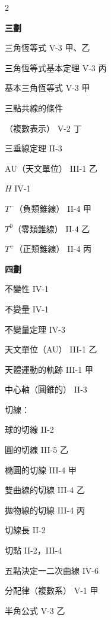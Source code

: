 \begin{multicols}{2}
\vspace{0.8em}
\begin{center}
\textbf{\large 三\quad 劃}
\end{center}

\noindent 三角恆等式 \hfill V-3 甲、乙\par
\noindent 三角恆等式基本定理 \hfill V-3 丙\par
\noindent 基本三角恆等式 \hfill V-3 甲\par
\noindent 三點共線的條件\par
\noindent\hspace*{1.5em} （複數表示） \hfill V-2 丁\par
\noindent 三垂線定理 \hfill II-3\par
\noindent $\text{AU}$（天文單位） \hfill III-1 乙\par
\noindent $H$ \hfill IV-1\par
\noindent $T^-$（負類錐線） \hfill II-4 甲\par
\noindent $T^0$（零類錐線） \hfill II-4 乙\par
\noindent $T^+$（正類錐線） \hfill II-4 丙\par

\vspace{0.8em}
\begin{center}
\textbf{\large 四\quad 劃}
\end{center}

\noindent 不變性 \hfill IV-1\par
\noindent 不變量 \hfill IV-1\par
\noindent 不變量定理 \hfill IV-3\par
\noindent 天文單位（AU） \hfill III-1 乙\par
\noindent 天體運動的軌跡 \hfill III-1 甲\par
\noindent 中心軸（圓錐的） \hfill II-3\par
\noindent 切線：\par
\noindent\hspace*{1.5em} 球的切線 \hfill II-2\par
\noindent\hspace*{1.5em} 圓的切線 \hfill III-5 乙\par
\noindent\hspace*{1.5em} 橢圓的切線 \hfill III-4 甲\par
\noindent\hspace*{1.5em} 雙曲線的切線 \hfill III-4 乙\par
\noindent\hspace*{1.5em} 拋物線的切線 \hfill III-4 丙\par
\noindent 切線長 \hfill II-2\par
\noindent 切點 \hfill II-2，III-4\par
\noindent 五點決定一二次曲線 \hfill IV-6\par
\noindent 分配律（複數系） \hfill V-1 甲\par
\noindent 半角公式 \hfill V-3 乙\par


\end{multicols}
